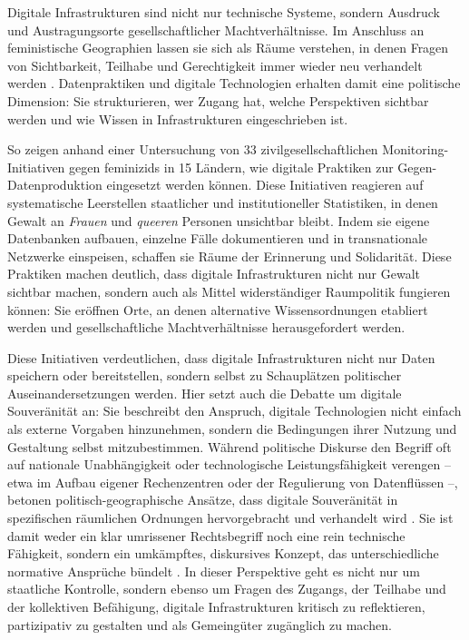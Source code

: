 \vspace{1em}

Digitale Infrastrukturen sind nicht nur technische Systeme, sondern Ausdruck und Austragungsorte gesellschaftlicher Machtverhältnisse. Im Anschluss an feministische Geographien lassen sie sich als Räume verstehen, in denen Fragen von Sichtbarkeit, Teilhabe und Gerechtigkeit immer wieder neu verhandelt werden \parencite{elwoodFeministDigitalGeographies2018}. Datenpraktiken und digitale Technologien erhalten damit eine politische Dimension: Sie strukturieren, wer Zugang hat, welche Perspektiven sichtbar werden und wie Wissen in Infrastrukturen eingeschrieben ist.

So zeigen \textcite{dignazioGeographiesMissingData2024} anhand einer Untersuchung von 33 zivilgesellschaftlichen Monitoring-Initiativen gegen \glspl{feminizid} in 15 Ländern, wie digitale Praktiken zur Gegen-Datenproduktion eingesetzt werden können. Diese Initiativen reagieren auf systematische Leerstellen staatlicher und institutioneller Statistiken, in denen Gewalt an \emph{Frauen} und \emph{queeren} Personen unsichtbar bleibt. Indem sie eigene Datenbanken aufbauen, einzelne Fälle dokumentieren und in transnationale Netzwerke einspeisen, schaffen sie Räume der Erinnerung und Solidarität. Diese Praktiken machen deutlich, dass digitale Infrastrukturen nicht nur Gewalt sichtbar machen, sondern auch als Mittel widerständiger Raumpolitik fungieren können: Sie eröffnen Orte, an denen alternative Wissensordnungen etabliert werden und gesellschaftliche Machtverhältnisse herausgefordert werden.

Diese Initiativen verdeutlichen, dass digitale Infrastrukturen nicht nur Daten speichern oder bereitstellen, sondern selbst zu Schauplätzen politischer Auseinandersetzungen werden. Hier setzt auch die Debatte um digitale Souveränität an: Sie beschreibt den Anspruch, digitale Technologien nicht einfach als externe Vorgaben hinzunehmen, sondern die Bedingungen ihrer Nutzung und Gestaltung selbst mitzubestimmen. Während politische Diskurse den Begriff oft auf nationale Unabhängigkeit oder technologische Leistungsfähigkeit verengen -- etwa im Aufbau eigener Rechenzentren oder der Regulierung von Datenflüssen --, betonen politisch-geographische Ansätze, dass digitale Souveränität in spezifischen räumlichen Ordnungen hervorgebracht und verhandelt wird \parencite{glaszeContestedSpatialitiesDigital2023}. Sie ist damit weder ein klar umrissener Rechtsbegriff noch eine rein technische Fähigkeit, sondern ein umkämpftes, diskursives Konzept, das unterschiedliche normative Ansprüche bündelt \parencite{pohleDigitalSovereignty2020}. In dieser Perspektive geht es nicht nur um staatliche Kontrolle, sondern ebenso um Fragen des Zugangs, der Teilhabe und der kollektiven Befähigung, digitale Infrastrukturen kritisch zu reflektieren, partizipativ zu gestalten und als Gemeingüter zugänglich zu machen.

